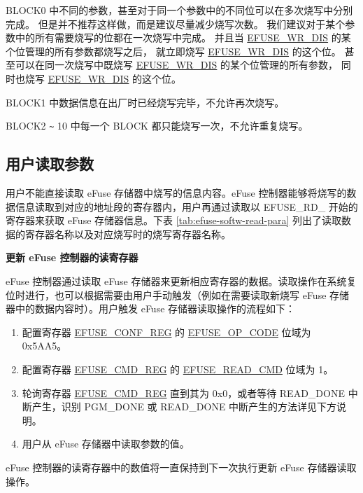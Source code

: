 \documentclass[main\_\_CN.tex]{subfiles}
\begin{document}
BLOCK0 中不同的参数，甚至对于同一个参数中的不同位可以在多次烧写中分别完成。
但是并不推荐这样做，而是建议尽量减少烧写次数。
我们建议对于某个参数中的所有需要烧写的位都在一次烧写中完成。
并且当 \hyperref[fielddesc:EFUSEWRDIS]{EFUSE\_WR\_DIS} 的某个位管理的所有参数都烧写之后，
就立即烧写 \hyperref[fielddesc:EFUSEWRDIS]{EFUSE\_WR\_DIS} 的这个位。
甚至可以在同一次烧写中既烧写 \hyperref[fielddesc:EFUSEWRDIS]{EFUSE\_WR\_DIS} 的某个位管理的所有参数，
同时也烧写 \hyperref[fielddesc:EFUSEWRDIS]{EFUSE\_WR\_DIS} 的这个位。

BLOCK1 中数据信息在出厂时已经烧写完毕，不允许再次烧写。

BLOCK2 \verb+~+ 10 中每一个 BLOCK 都只能烧写一次，不允许重复烧写。

\subsection{用户读取参数}
\label{sec:efuse-software-read-para}

用户不能直接读取 eFuse 存储器中烧写的信息内容。eFuse 控制器能够将烧写的数据信息读取到对应的地址段的寄存器内，用户再通过读取以 EFUSE\_RD\_ 开始的寄存器来获取 eFuse 存储器信息。下表 \ref{tab:efuse-softw-read-para} 列出了读取数据的寄存器名称以及对应烧写时的烧写寄存器名称。



{\bfseries 更新 eFuse 控制器的读寄存器}
\label{sec:efuse-update-reg}

eFuse 控制器通过读取 eFuse 存储器来更新相应寄存器的数据。读取操作在系统复位时进行，也可以根据需要由用户手动触发（例如在需要读取新烧写 eFuse 存储器中的数据内容时）。用户触发 eFuse 存储器读取操作的流程如下：
\begin{enumerate}
    \item 配置寄存器 \hyperref[regdesc:EFUSECONFREG]{EFUSE\_CONF\_REG} 的 \hyperref[fielddesc:EFUSEOPCODE]{EFUSE\_OP\_CODE} 位域为 0x5AA5。
    \item 配置寄存器 \hyperref[regdesc:EFUSECMDREG]{EFUSE\_CMD\_REG} 的 \hyperref[fielddesc:EFUSEREADCMD]{EFUSE\_READ\_CMD} 位域为 1。
    \item 轮询寄存器 \hyperref[regdesc:EFUSECMDREG]{EFUSE\_CMD\_REG} 直到其为 0x0，或者等待 READ\_DONE 中断产生，识别 PGM\_DONE 或 READ\_DONE 中断产生的方法详见下方说明。
    \item 用户从 eFuse 存储器中读取参数的值。
\end{enumerate}
eFuse 控制器的读寄存器中的数值将一直保持到下一次执行更新 eFuse 存储器读取操作。
\end{document}
